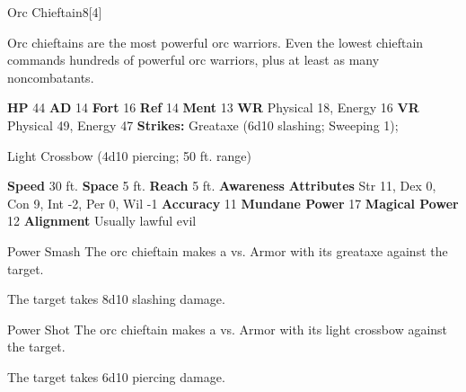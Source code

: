   \begin{monsubsection}{Orc Chieftain}{8}[4]
    \vspace{-1em}\vspace{-1em}
    \vspace{0em}

    
          Orc chieftains are the most powerful orc warriors.
          Even the lowest chieftain commands hundreds of powerful orc warriors, plus at least as many noncombatants.
        

    \begin{spellcontent}
      \begin{spelltargetinginfo}
        \pari \textbf{HP} 44 \monsep
          \textbf{AD} 14 \monsep
          \textbf{Fort} 16 \monsep
          \textbf{Ref} 14 \monsep
          \textbf{Ment} 13
        \pari \textbf{WR} Physical 18, Energy 16 \monsep
        \textbf{VR} Physical 49, Energy 47
        \pari \textbf{Strikes:}
            Greataxe  (6d10 slashing; Sweeping 1);
\par Light Crossbow  (4d10 piercing; 50 ft. range)
      \end{spelltargetinginfo}
    \end{spellcontent}
    \begin{monsterfooter}
      \pari \textbf{Speed} 30 ft. \monsep
        \textbf{Space} 5 ft. \monsep
        \textbf{Reach} 5 ft.
      \pari \textbf{Awareness} 
      \pari \textbf{Attributes}
        Str 11, Dex 0,
        Con 9, Int -2,
        Per 0, Wil -1
      \pari \textbf{Accuracy} 11 \monsep
        \textbf{Mundane Power} 17 \monsep
      \textbf{Magical Power} 12
      \pari \textbf{Alignment} Usually lawful evil
    \end{monsterfooter}
  \end{monsubsection}
  \begin{freeability}{Power Smash}
       The orc chieftain makes a 
         vs. Armor
        with its greataxe against the target.
    
    \hit The target takes 8d10 slashing damage.
    \end{freeability}
  

    \begin{freeability}{Power Shot}
       The orc chieftain makes a 
         vs. Armor
        with its light crossbow against the target.
    
    \hit The target takes 6d10 piercing damage.
    \end{freeability}
  

